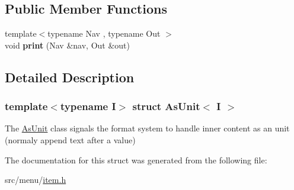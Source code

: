 \subsection*{Public Member Functions}
\begin{DoxyCompactItemize}
\item 
\mbox{\label{structAsUnit_a616d2dd2d3909db6766e676d04f9ede4}} 
{\footnotesize template$<$typename Nav , typename Out $>$ }\\void {\bfseries print} (Nav \&nav, Out \&out)
\end{DoxyCompactItemize}


\subsection{Detailed Description}
\subsubsection*{template$<$typename I$>$\newline
struct As\+Unit$<$ I $>$}

The \hyperlink{structAsUnit}{As\+Unit} class signals the format system to handle inner content as an unit (normaly append text after a value) 

The documentation for this struct was generated from the following file\+:\begin{DoxyCompactItemize}
\item 
src/menu/\hyperlink{item_8h}{item.\+h}\end{DoxyCompactItemize}
